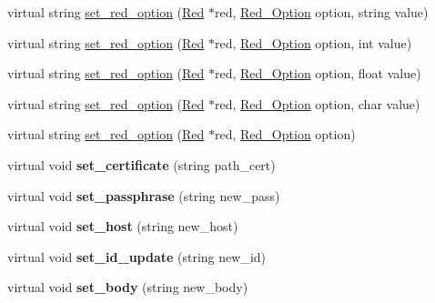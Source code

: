 \begin{DoxyCompactItemize}
\item 
virtual string \hyperlink{classRed_a294656928f03f537693a815ea6a09d06}{set\+\_\+red\+\_\+option} (\hyperlink{classRed}{Red} $\ast$red, \hyperlink{Red_8h_a698dd63ab362aeda6776c6d7607de714}{Red\+\_\+\+Option} option, string value)
\item 
virtual string \hyperlink{classRed_ad0590040b4d8a7aee0a21fdd1b4c69bd}{set\+\_\+red\+\_\+option} (\hyperlink{classRed}{Red} $\ast$red, \hyperlink{Red_8h_a698dd63ab362aeda6776c6d7607de714}{Red\+\_\+\+Option} option, int value)
\item 
virtual string \hyperlink{classRed_a1cf6e8edd129a42ebb7e95d9cf122f4e}{set\+\_\+red\+\_\+option} (\hyperlink{classRed}{Red} $\ast$red, \hyperlink{Red_8h_a698dd63ab362aeda6776c6d7607de714}{Red\+\_\+\+Option} option, float value)
\item 
virtual string \hyperlink{classRed_a6501c919c1a6dc454c065d08ee6b61e0}{set\+\_\+red\+\_\+option} (\hyperlink{classRed}{Red} $\ast$red, \hyperlink{Red_8h_a698dd63ab362aeda6776c6d7607de714}{Red\+\_\+\+Option} option, char value)
\item 
virtual string \hyperlink{classRed_a1b7572b93514b3d24fc6f48dfec62ce1}{set\+\_\+red\+\_\+option} (\hyperlink{classRed}{Red} $\ast$red, \hyperlink{Red_8h_a698dd63ab362aeda6776c6d7607de714}{Red\+\_\+\+Option} option)
\item 
virtual void {\bfseries set\+\_\+certificate} (string path\+\_\+cert)\hypertarget{classRed_a25eeb39f8b3d92f7bff1ddc7611006fe}{}\label{classRed_a25eeb39f8b3d92f7bff1ddc7611006fe}

\item 
virtual void {\bfseries set\+\_\+passphrase} (string new\+\_\+pass)\hypertarget{classRed_a2ae5cc5e670b3e7bc6f5957886c46848}{}\label{classRed_a2ae5cc5e670b3e7bc6f5957886c46848}

\item 
virtual void {\bfseries set\+\_\+host} (string new\+\_\+host)\hypertarget{classRed_af1c243a3f509f0399396b3d47142afc1}{}\label{classRed_af1c243a3f509f0399396b3d47142afc1}

\item 
virtual void {\bfseries set\+\_\+id\+\_\+update} (string new\+\_\+id)\hypertarget{classRed_a2ae1bfdce168c482279dd048de3f327e}{}\label{classRed_a2ae1bfdce168c482279dd048de3f327e}

\item 
virtual void {\bfseries set\+\_\+body} (string new\+\_\+body)\hypertarget{classRed_a5194c9c1918552f24f64dc1b8eaff064}{}\label{classRed_a5194c9c1918552f24f64dc1b8eaff064}


\end{DoxyCompactItemize}
